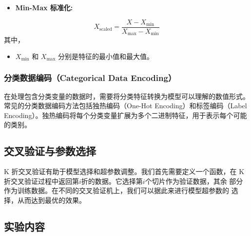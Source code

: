 \documentclass[a4paper,12pt]{article}
\begin{document}
\begin{itemize}
\item \textbf{Min-Max 标准化:}
\end{itemize}
\[ X_{\text{scaled}} = \frac{X - X_{\text{min}}}{X_{\text{max}} - X_{\text{min}}} \]
其中，
\begin{itemize}
    \item \( X_{\text{min}} \) 和 \( X_{\text{max}} \) 分别是特征的最小值和最大值。
\end{itemize}

\subsubsection{分类数据编码（Categorical Data Encoding）}
在处理包含分类变量的数据时，需要将分类特征转换为模型可以理解的数值形式。常见的分类数据编码方法包括独热编码（One-Hot Encoding）和标签编码（Label Encoding）。独热编码将每个分类变量扩展为多个二进制特征，用于表示每个可能的类别。

\subsection{交叉验证与参数选择}
K 折交叉验证有助于模型选择和超参数调整。我们首先需要定义一个函数，在
K 折交叉验证过程中返回第$i$折的数据。它选择第$i$个切片作为验证数据，其余
部分作为训练数据。在不同的交叉验证机上，我们可以据此来进行模型超参数的
选择，从而达到最优的效果。

\subsection{实验内容}
\end{document}
